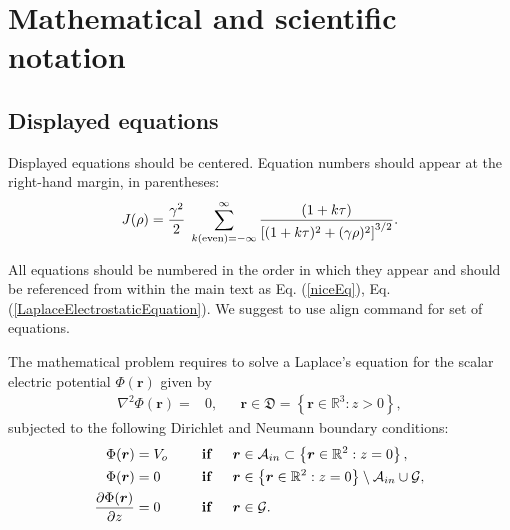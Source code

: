 \documentclass[10pt]{article}
\begin{document}
\section{Mathematical and scientific notation}

\subsection{Displayed equations} Displayed equations should be centered.
Equation numbers should appear at the right-hand margin, in
parentheses:
\begin{equation}
	J(\rho) =
	\frac{\gamma^2}{2} \; \sum_{k({\rm even}) = -\infty}^{\infty}
	\frac{(1 + k \tau)}{ \left[ (1 + k \tau)^2 + (\gamma  \rho)^2  \right]^{3/2} }.
	\label{niceEq}
\end{equation}

All equations should be numbered in the order in which they appear
and should be referenced  from within the main text as Eq. (\ref{niceEq}),
Eq. (\ref{LaplaceElectrostaticEquation}). We suggest to use align command for set of equations.

The mathematical problem requires to solve a Laplace's equation for the scalar electric potential $\Phi(\boldsymbol{r})$ given by
\begin{align}
	\nabla^2 \Phi(\boldsymbol{r}) = & 0, &  & \boldsymbol{r} \in \mathfrak{D}=\left\{\boldsymbol{r} \in \mathbb{R}^3 : z > 0 \right\}, \label{LaplaceElectrostaticEquation}
\end{align}{}
subjected to the following Dirichlet and Neumann boundary conditions:
\begin{align}
	\Phi(\boldsymbol{r})                             & = V_o  \hspace{0.5cm} &  & \mbox{\textbf{if}} \hspace{0.5cm} \boldsymbol{r} \in \mathcal{A}_{in} \subset \left\{\boldsymbol{r} \in \mathbb{R}^2 : z = 0 \right\},\label{DirichletBoundaryConditionsEq1} \\
	\Phi(\boldsymbol{r})                             & = 0 \hspace{0.5cm}    &  & \mbox{\textbf{if}} \hspace{0.5cm} \boldsymbol{r} \in \left\{\boldsymbol{r} \in \mathbb{R}^2 : z = 0 \right\}\setminus\mathcal{A}_{in}\cup\mathcal{G},
	\label{DirichletBoundaryConditionsEq2}                                                                                                                                                                                                                     \\
	\frac{\partial \Phi(\boldsymbol{r})}{\partial z} & =0                    &  & \mbox{\textbf{if}} \hspace{0.5cm} \boldsymbol{r} \in \mathcal{G}.
	\label{NeumannBoundaryConditionsEq}
\end{align}
\end{document}
